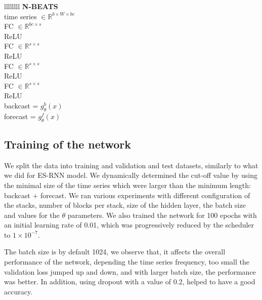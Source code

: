 \documentclass{article}
\begin{document}
\begin{table}[!ht]
	\centering
	\begin{tabular}{llllllll} 
		\midrule
			 {\textbf{N-BEATS}} \\
		\midrule
			 {time series $\in \mathbb{R}^{b \times W \times bc}$} \\
		\midrule
			 {FC  $\in \mathbb{R}^{bc \times s}$} \\		
		\midrule
			 {ReLU} \\		
		\midrule
			 {FC  $\in \mathbb{R}^{s \times s}$} \\		
		\midrule
			 {ReLU} \\		
		\midrule
			 {FC  $\in \mathbb{R}^{s \times s}$} \\		
		\midrule
			 {ReLU} \\		
		\midrule
			 {FC  $\in \mathbb{R}^{s \times s}$} \\		
		\midrule
			 {ReLU} \\		
		\midrule
			 {backcast = $g_\theta^b(x)$} \\		
			 {forecast = $g_\theta^f(x)$} \\		
		\midrule
	\end{tabular}
	\caption{N-BEATS architecture. Let $b$ the batch size, W is the number of input windows, bc backcast length, s is the size of the hidden layer.}
	\label{tab:nbeatsstack}
\end{table}

\subsection{Training of the network}
We split the data into training and validation and test datasets, similarly to what we did for ES-RNN model.
We dynamically determined the cut-off value by using the minimal size of the time series which
were larger than the minimum length: backcast + forecast. We ran various experiments with different configuration of the stacks, number of blocks per stack, 
size of the hidden layer, the batch size and values  for the $\theta$ parameters.  We also trained the network for 100 epochs with an initial learning rate of 0.01,
 which was progressively reduced by the scheduler to $1 \times 10^{-7}$.

 The batch size is by default 1024, we observe that, it affects the overall performance of the network, depending the time series frequency,
 too small the validation loss jumped up and down, and with larger batch size, the performance was better.
 In addition, using dropout with a value of 0.2, helped to have a good accuracy.
\end{document}
